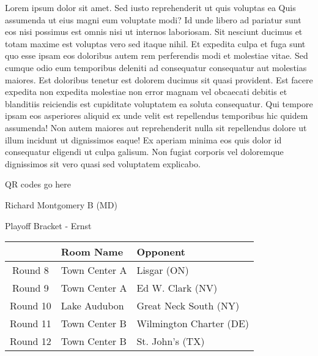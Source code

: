 \documentclass{article}%
\begin{document}
\vspace*{8pt}%
\linebreak%
\newline%
\newline%
Lorem ipsum dolor sit amet. Sed iusto reprehenderit ut quis voluptas ea Quis assumenda ut eius magni eum voluptate modi? Id unde libero ad pariatur sunt eos nisi possimus est omnis nisi ut internos laboriosam. Sit nesciunt ducimus et totam maxime est voluptas vero sed itaque nihil. Et expedita culpa et fuga sunt quo esse ipsam eos doloribus autem rem perferendis modi et molestiae vitae.\newline%
\newline%
Sed cumque odio eum temporibus deleniti ad consequatur consequatur aut molestias maiores. Est doloribus tenetur est dolorem ducimus sit quasi provident. Est facere expedita non expedita molestiae non error magnam vel obcaecati debitis et blanditiis reiciendis est cupiditate voluptatem ea soluta consequatur. Qui tempore ipsam eos asperiores aliquid ex unde velit est repellendus temporibus hic quidem assumenda!\newline%
\newline%
Non autem maiores aut reprehenderit nulla sit repellendus dolore ut illum incidunt ut dignissimos eaque! Ex aperiam minima eos quis dolor id consequatur eligendi ut culpa galisum. Non fugiat corporis vel doloremque dignissimos sit vero quasi sed voluptatem explicabo.\newline%
\newline%
%
\vspace*{30pt}%
\begin{center}%
\begin{Huge}%
QR codes go here%
\end{Huge}%
\end{center}%
\newpage%
\begin{center}%
\begin{Huge}%
Richard Montgomery B (MD)%
\end{Huge}%
\vspace*{8pt}%
\linebreak%
\begin{Large}%
Playoff Bracket {-} Ernst%
\end{Large}%
\end{center}%
%
\begin{tabularx}{\textwidth}{|c|Y|Y|}%
\hline%
&Room Name&Opponent\\%
\hline%
Round 8&Town Center A&Lisgar (ON)\\%
Round 9&Town Center A&Ed W. Clark (NV)\\%
Round 10&Lake Audubon&Great Neck South (NY)\\%
Round 11&Town Center B&Wilmington Charter (DE)\\%
Round 12&Town Center B&St. John's (TX)\\%
\hline%
\end{tabularx}%
\end{document}

